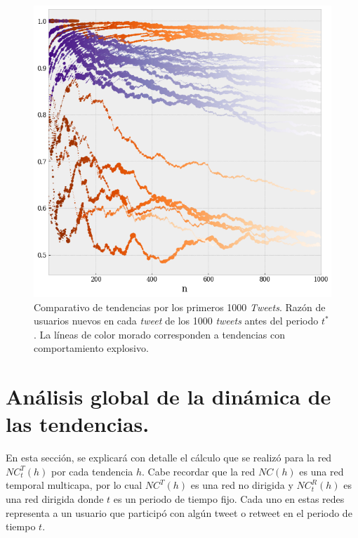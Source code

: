 \documentclass[../main.tex]{subfiles}
\begin{document}


\begin{figure}
    \centering
    \includegraphics[scale = 0.5]{images/resultados_razonusuarios.png}
    \caption{ Comparativo de tendencias por los primeros 1000 \textit{Tweets}. Razón de usuarios nuevos en cada \textit{tweet} de los 1000 \textit{tweets} antes del periodo $t^{*}$. La líneas de color morado corresponden a tendencias con comportamiento explosivo.  }
    \label{fig:resultados_1000Tweets}
\end{figure}

\section{Análisis global de la dinámica de las tendencias.}


En esta sección, se explicará con detalle el cálculo que se realizó para la red $NC_{t}^{T}(h)$ por cada tendencia $h$. Cabe recordar que la red $NC(h)$ es una red temporal multicapa, por lo cual $NC^{T}(h)$ es una red no dirigida y $NC_{t}^{R}(h)$ es una red dirigida donde $t$ es un periodo de tiempo fijo. Cada uno en estas redes representa a un usuario que participó con algún tweet o retweet en el periodo de tiempo $t$.
\end{document}
